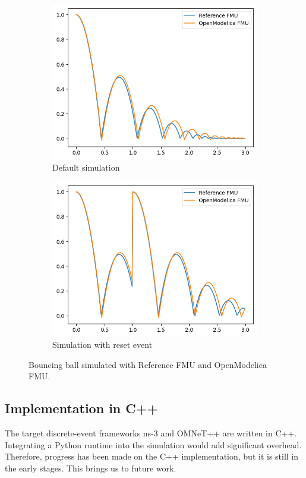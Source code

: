 \documentclass[conference]{IEEEtran}
\def\ns3{ns-3}
\begin{document}
\begin{figure}[htbp]
  \centering
  \begin{subfigure}[b]{\linewidth}
    \centering
    \includegraphics[width=0.5\linewidth]{images/fmu-comparsion-no-event.png}
    \caption{Default simulation}
    \label{fmu-comparsion-no-event}
  \end{subfigure}
  
  \vspace{1em}
  
  \begin{subfigure}[b]{\linewidth}
    \centering
    \includegraphics[width=0.5\linewidth]{images/fmu-comparsion-with-event.png}
    \caption{Simulation with reset event}
    \label{fmu-comparsion-with-event}
  \end{subfigure}
  
  \caption{Bouncing ball simulated with Reference FMU and OpenModelica FMU.}
  \label{comparsion-ref-om}
\end{figure}

\subsection{Implementation in C++}

The target discrete-event frameworks \ns3 and OMNeT++ are written in C++.
Integrating  a Python runtime into the simulation would add significant overhead.
Therefore, progress has been made on the C++ implementation, but it is still in the early stages. This brings us to future work.
\end{document}
